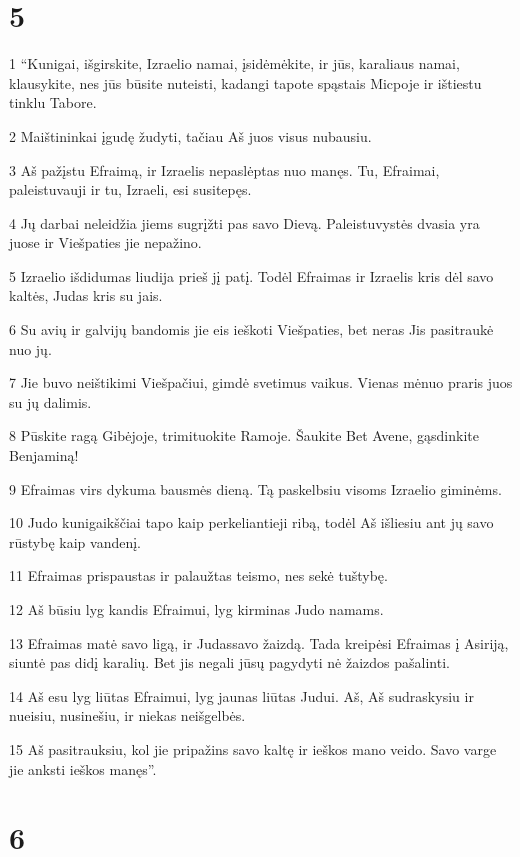\chapter{5}


\par 1 “Kunigai, išgirskite, Izraelio namai, įsidėmėkite, ir jūs, karaliaus namai, klausykite, nes jūs būsite nuteisti, kadangi tapote spąstais Micpoje ir ištiestu tinklu Tabore. 
\par 2 Maištininkai įgudę žudyti, tačiau Aš juos visus nubausiu. 
\par 3 Aš pažįstu Efraimą, ir Izraelis nepaslėptas nuo manęs. Tu, Efraimai, paleistuvauji ir tu, Izraeli, esi susitepęs. 
\par 4 Jų darbai neleidžia jiems sugrįžti pas savo Dievą. Paleistuvystės dvasia yra juose ir Viešpaties jie nepažino. 
\par 5 Izraelio išdidumas liudija prieš jį patį. Todėl Efraimas ir Izraelis kris dėl savo kaltės, Judas kris su jais. 
\par 6 Su avių ir galvijų bandomis jie eis ieškoti Viešpaties, bet neras­ Jis pasitraukė nuo jų. 
\par 7 Jie buvo neištikimi Viešpačiui, gimdė svetimus vaikus. Vienas mėnuo praris juos su jų dalimis. 
\par 8 Pūskite ragą Gibėjoje, trimituokite Ramoje. Šaukite Bet Avene, gąsdinkite Benjaminą! 
\par 9 Efraimas virs dykuma bausmės dieną. Tą paskelbsiu visoms Izraelio giminėms. 
\par 10 Judo kunigaikščiai tapo kaip perkeliantieji ribą, todėl Aš išliesiu ant jų savo rūstybę kaip vandenį. 
\par 11 Efraimas prispaustas ir palaužtas teismo, nes sekė tuštybę. 
\par 12 Aš būsiu lyg kandis Efraimui, lyg kirminas Judo namams. 
\par 13 Efraimas matė savo ligą, ir Judas­savo žaizdą. Tada kreipėsi Efraimas į Asiriją, siuntė pas didį karalių. Bet jis negali jūsų pagydyti nė žaizdos pašalinti. 
\par 14 Aš esu lyg liūtas Efraimui, lyg jaunas liūtas Judui. Aš, Aš sudraskysiu ir nueisiu, nusinešiu, ir niekas neišgelbės. 
\par 15 Aš pasitrauksiu, kol jie pripažins savo kaltę ir ieškos mano veido. Savo varge jie anksti ieškos manęs”.



\chapter{6}


